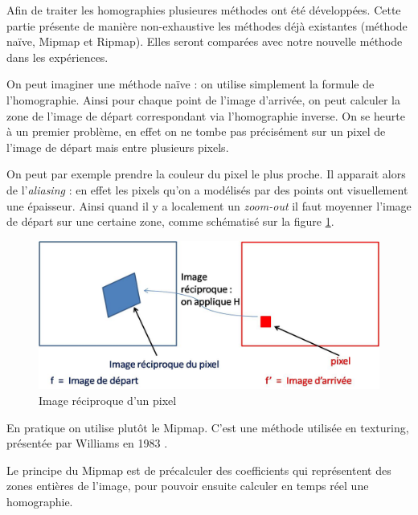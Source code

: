   Afin de traiter les homographies plusieures méthodes ont été développées. Cette partie présente de manière non-exhaustive les méthodes déjà existantes (méthode naïve, Mipmap et Ripmap). Elles seront comparées avec notre nouvelle méthode dans les expériences.



On peut imaginer une méthode naïve : on utilise simplement la formule de l'homographie. Ainsi pour chaque point de l'image d'arrivée, on peut calculer la zone de l'image de départ correspondant via l'homographie inverse. On se heurte à un premier problème, en effet on ne tombe pas précisément sur un pixel de l'image de départ mais entre plusieurs pixels. 

On peut par exemple prendre la couleur du pixel le plus proche. Il apparait alors de l'\emph{aliasing} : en effet les pixels qu'on a modélisés par des points ont visuellement une épaisseur. Ainsi quand il y a localement un \emph{zoom-out} il faut moyenner l'image de départ sur une certaine zone, comme schématisé sur la figure \ref{imagereciproque}.


\begin{figure}[h!]
\centering
\includegraphics[scale=0.5]{imagereciproque.jpg}
\caption{Image réciproque d'un pixel}
\label{imagereciproque}
\end{figure}

En pratique on utilise plutôt le Mipmap. C'est une méthode utilisée en texturing, présentée par Williams en 1983 \cite{williams1983pyramidal}.

\label{Mipmap}
Le principe du Mipmap est de précalculer des coefficients qui représentent des zones entières de l'image, pour pouvoir ensuite calculer en temps réel une homographie. 

